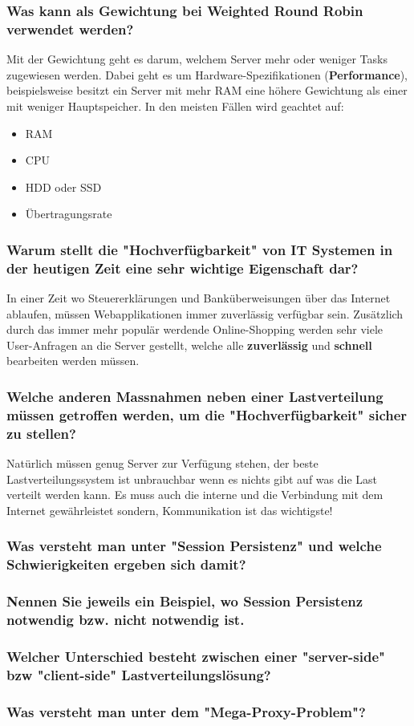 \subsubsection{Was kann als Gewichtung bei Weighted Round Robin verwendet werden?}
Mit der Gewichtung geht es darum, welchem Server mehr oder weniger Tasks zugewiesen werden. Dabei geht es um Hardware-Spezifikationen (\textbf{Performance}), beispielsweise besitzt ein Server mit mehr RAM eine höhere Gewichtung als einer mit weniger Hauptspeicher.
In den meisten Fällen wird geachtet auf:

\begin{itemize}
	\item RAM
	\item CPU
	\item HDD oder SSD
	\item Übertragungsrate
\end{itemize}

\subsubsection{Warum stellt die "Hochverfügbarkeit" von IT Systemen in der heutigen Zeit eine sehr wichtige Eigenschaft dar?}
In einer Zeit wo Steuererklärungen und Banküberweisungen über das Internet ablaufen, müssen Webapplikationen immer zuverlässig verfügbar sein. Zusätzlich durch das immer mehr populär werdende Online-Shopping werden sehr viele User-Anfragen an die Server gestellt, welche alle \textbf{zuverlässig} und \textbf{schnell} bearbeiten werden müssen.
\subsubsection{Welche anderen Massnahmen neben einer Lastverteilung müssen getroffen werden, um die "Hochverfügbarkeit" sicher zu stellen?}
Natürlich müssen genug Server zur Verfügung stehen, der beste Lastverteilungssystem ist unbrauchbar wenn es nichts gibt auf was die Last verteilt werden kann. Es muss auch die interne und die Verbindung mit dem Internet gewährleistet sondern, Kommunikation ist das wichtigste!
\subsubsection{Was versteht man unter "Session Persistenz" und welche Schwierigkeiten ergeben sich damit?}
\subsubsection{Nennen Sie jeweils ein Beispiel, wo Session Persistenz notwendig bzw. nicht notwendig ist.}
\subsubsection{Welcher Unterschied besteht zwischen einer "server-side" bzw "client-side" Lastverteilungslösung?}
\subsubsection{Was versteht man unter dem "Mega-Proxy-Problem"?}

